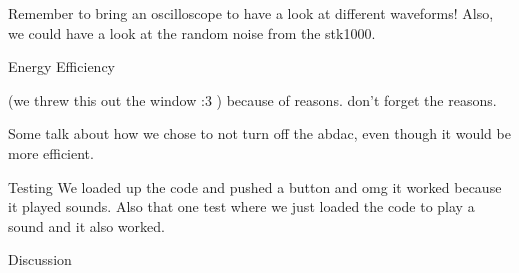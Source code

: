 

Remember to bring an oscilloscope to have a look at different waveforms! Also, we could have a look at the random noise from the stk1000.

Energy Efficiency

(we threw this out the window :3 )
because of reasons. don't forget the reasons.

Some talk about how we chose to not turn off the abdac, even though it would be more efficient.


Testing
We loaded up the code and pushed a button and omg it worked because it played sounds.
Also that one test where we just loaded the code to play a sound and it also worked.


Discussion

